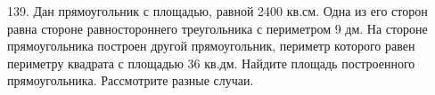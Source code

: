 139. Дан прямоугольник с площадью, равной 2400 кв.см. Одна из его сторон равна стороне равностороннего треугольника с периметром 9 дм. На стороне прямоугольника построен другой прямоугольник, периметр которого равен периметру квадрата с площадью 36 кв.дм. Найдите площадь построенного прямоугольника. Рассмотрите разные случаи.\\
